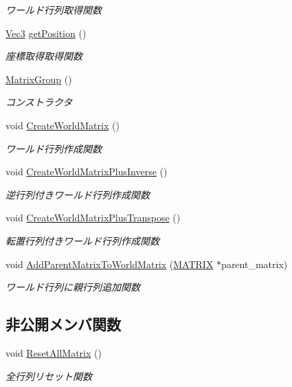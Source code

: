 \begin{DoxyCompactItemize}
\begin{DoxyCompactList}\small\item\em ワールド行列取得関数 \end{DoxyCompactList}\item 
\mbox{\hyperlink{_vector3_d_8h_ab16f59e4393f29a01ec8b9bbbabbe65d}{Vec3}} \mbox{\hyperlink{class_matrix_group_a4d8785ad38523bba65ae5de3fc1b5202}{get\+Position}} ()
\begin{DoxyCompactList}\small\item\em 座標取得取得関数 \end{DoxyCompactList}\item 
\mbox{\hyperlink{class_matrix_group_accbaedd4ff498f5f5c9dd6b586724760}{Matrix\+Group}} ()
\begin{DoxyCompactList}\small\item\em コンストラクタ \end{DoxyCompactList}\item 
void \mbox{\hyperlink{class_matrix_group_a2a123f43e2af3c1767f7972bca9dfacb}{Create\+World\+Matrix}} ()
\begin{DoxyCompactList}\small\item\em ワールド行列作成関数 \end{DoxyCompactList}\item 
void \mbox{\hyperlink{class_matrix_group_a91fd88f4462a2a1eccf955382a4e1282}{Create\+World\+Matrix\+Plus\+Inverse}} ()
\begin{DoxyCompactList}\small\item\em 逆行列付きワールド行列作成関数 \end{DoxyCompactList}\item 
void \mbox{\hyperlink{class_matrix_group_a24045c3c4a4aa8eff02e0aa926e5e2d3}{Create\+World\+Matrix\+Plus\+Transpose}} ()
\begin{DoxyCompactList}\small\item\em 転置行列付きワールド行列作成関数 \end{DoxyCompactList}\item 
void \mbox{\hyperlink{class_matrix_group_a79162f8fa1bab75e5e9dd505c1c08f13}{Add\+Parent\+Matrix\+To\+World\+Matrix}} (\mbox{\hyperlink{_matrix_8h_a032295cd9fb1b711757c90667278e744}{M\+A\+T\+R\+IX}} $\ast$parent\+\_\+matrix)
\begin{DoxyCompactList}\small\item\em ワールド行列に親行列追加関数 \end{DoxyCompactList}\end{DoxyCompactItemize}
\subsection*{非公開メンバ関数}
\begin{DoxyCompactItemize}
\item 
void \mbox{\hyperlink{class_matrix_group_ace011440a1a9367bf60571d8db482ee7}{Reset\+All\+Matrix}} ()
\begin{DoxyCompactList}\small\item\em 全行列リセット関数 \end{DoxyCompactList}\end{DoxyCompactItemize}

